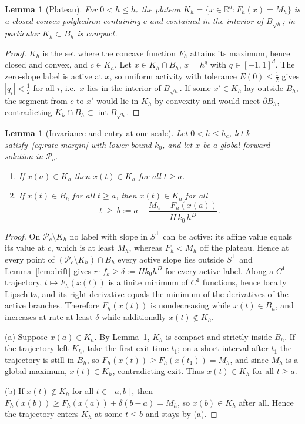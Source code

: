 \documentclass[11pt,a4paper]{article}
\theoremstyle{plain}
\newtheorem{lemma}[theorem]{Lemma}
\theoremstyle{definition}
\theoremstyle{remark}
\newcommand{\R}{\mathbb R}
\newcommand{\calP}{\mathcal P}
\begin{document}
\begin{lemma}[Plateau]\label{lem:plateau}
For $0<h\le h_c$ the plateau $K_h=\{x\in\R^d:F_h(x)=M_h\}$ is a closed convex polyhedron containing $c$ and contained in the interior of $B_{\sqrt h}$; in particular $K_h\subset B_h$ is compact.
\end{lemma}

\begin{proof}
$K_h$ is the set where the concave function $F_h$ attains its maximum, hence closed and convex, and $c\in K_h$. Let $x\in K_h\cap B_h$, $x=h^q$ with $q\in[-1,1]^d$. The zero-slope label is active at $x$, so uniform activity with tolerance $E(0)\le\tfrac12$ gives $|q_i|<\tfrac12$ for all $i$, i.e.\ $x$ lies in the interior of $B_{\sqrt h}$. If some $x'\in K_h$ lay outside $B_h$, the segment from $c$ to $x'$ would lie in $K_h$ by convexity and would meet $\partial B_h$, contradicting $K_h\cap B_h\subset\operatorname{int}B_{\sqrt h}$.
\end{proof}

\begin{lemma}[Invariance and entry at one scale]\label{lem:entry}
Let $0<h\le h_c$, let $k$ satisfy~\eqref{eq:rate-margin} with lower bound $k_0$, and let $x$ be a global forward solution in $\calP_c$.
\begin{enumerate}[label=(\alph*)]
\item If $x(a)\in K_h$ then $x(t)\in K_h$ for all $t\ge a$.
\item If $x(t)\in B_h$ for all $t\ge a$, then $x(t)\in K_h$ for all
\[
 t\ \ge\ b:=a+\frac{M_h-F_h(x(a))}{H\,k_0\,h^{D}} .
\]
\end{enumerate}
\end{lemma}

\begin{proof}
On $\calP_c\setminus K_h$ no label with slope in $S^\perp$ can be active: its affine value equals its value at $c$, which is at least $M_h$, whereas $F_h<M_h$ off the plateau. Hence at every point of $(\calP_c\setminus K_h)\cap B_h$ every active slope lies outside $S^\perp$ and Lemma~\ref{lem:drift} gives $r\cdot f_k\ge\delta:=Hk_0h^D$ for every active label. Along a $C^1$ trajectory, $t\mapsto F_h(x(t))$ is a finite minimum of $C^1$ functions, hence locally Lipschitz, and its right derivative equals the minimum of the derivatives of the active branches. Therefore $F_h(x(t))$ is nondecreasing while $x(t)\in B_h$, and increases at rate at least $\delta$ while additionally $x(t)\notin K_h$.

(a) Suppose $x(a)\in K_h$. By Lemma~\ref{lem:plateau}, $K_h$ is compact and strictly inside $B_h$. If the trajectory left $K_h$, take the first exit time $t_1$; on a short interval after $t_1$ the trajectory is still in $B_h$, so $F_h(x(t))\ge F_h(x(t_1))=M_h$, and since $M_h$ is a global maximum, $x(t)\in K_h$, contradicting exit. Thus $x(t)\in K_h$ for all $t\ge a$.

(b) If $x(t)\notin K_h$ for all $t\in[a,b]$, then $F_h(x(b))\ge F_h(x(a))+\delta(b-a)=M_h$, so $x(b)\in K_h$ after all. Hence the trajectory enters $K_h$ at some $t\le b$ and stays by (a).
\end{proof}
\end{document}
